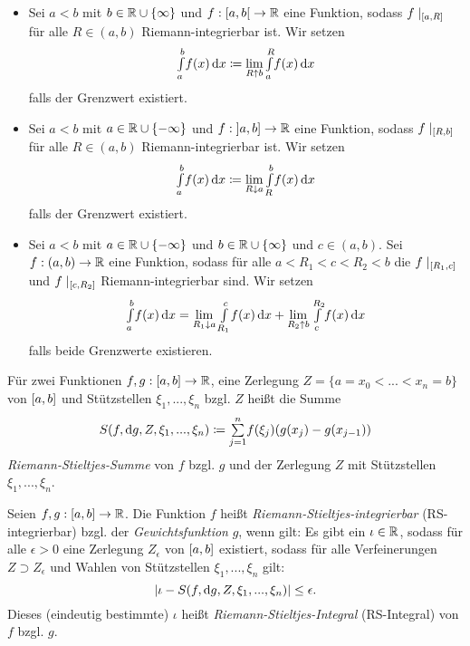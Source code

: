 \documentclass{cheat-sheet}
\begin{document}
\begin{defn}
\begin{itemize}
  \item Sei $a < b$ mit $b \in \mathbb{R} \cup \{ \infty \}$ und $f : \left[ a, b \right[ \to \mathbb{R}$ eine Funktion, sodass $f\mid_{\left[ a, R \right]}$ für alle $R \in (a, b)$ Riemann-integrierbar ist. Wir setzen
  \[ {\textstyle \int\limits_{a}^{b}} f(x) \,\mathrm{d} x \coloneqq \lim_{R \uparrow b} {\textstyle \int\limits_{a}^{R}} f(x) \,\mathrm{d} x \]
  falls der Grenzwert existiert.
  \item Sei $a < b$ mit $a \in \mathbb{R} \cup \{ -\infty \}$ und $f : \left] a, b \right] \to \mathbb{R}$ eine Funktion, sodass $f\mid_{\left[ R, b \right]}$ für alle $R \in (a, b)$ Riemann-integrierbar ist. Wir setzen
  \[ {\textstyle \int\limits_{a}^{b}} f(x) \,\mathrm{d} x \coloneqq \lim_{R \downarrow a} {\textstyle \int\limits_{R}^{b}} f(x) \,\mathrm{d} x \]
  falls der Grenzwert existiert.
  \item Sei $a < b$ mit $a \in \mathbb{R} \cup \{ -\infty \}$ und $b \in \mathbb{R} \cup \{ \infty \}$ und $c \in (a, b)$. Sei $f : (a, b) \to \mathbb{R}$ eine Funktion, sodass für alle $a < R_1 < c < R_2 < b$ die $f\mid_{\left[ R_1, c \right]}$ und $f\mid_{\left[ c, R_2 \right]}$ Riemann-integrierbar sind. Wir setzen
  \[ {\textstyle \int\limits_{a}^{b}} f(x) \,\mathrm{d} x = \lim_{R_1 \downarrow a} {\textstyle \int\limits_{R_1}^{c}} f(x) \,\mathrm{d} x + \lim_{R_2 \uparrow b} {\textstyle \int\limits_{c}^{R_2}} f(x) \,\mathrm{d} x \]
  falls beide Grenzwerte existieren.
\end{itemize}
\end{defn}


\begin{defn}
Für zwei Funktionen $f, g : \left[ a, b \right] \to \mathbb{R}$, eine Zerlegung $Z = \{ a = x_0 < ... < x_n = b \}$ von $\left[ a, b \right]$ und Stützstellen $\xi_1, ..., \xi_n$ bzgl. $Z$ heißt die Summe
\[ S(f, \d g, Z, \xi_1, ..., \xi_n) \coloneqq \sum_{j=1}^{n}\!f(\xi_j)(g(x_j) - g(x_{j{-}1})) \]
\emph{Riemann-Stieltjes-Summe} von $f$ bzgl. $g$ und der Zerlegung $Z$ mit Stützstellen $\xi_1, ..., \xi_n$.
\end{defn}

\begin{defn}
  Seien $f, g : \left[ a, b \right] \to \mathbb{R}$. Die Funktion $f$ heißt \emph{Riemann-Stieltjes-integrierbar} (RS-integrierbar) bzgl. der \emph{Gewichtsfunktion} $g$, wenn gilt: Es gibt ein $\iota \in \mathbb{R}$, sodass für alle $\epsilon > 0$ eine Zerlegung $Z_{\epsilon}$ von $\left[ a, b \right]$ existiert, sodass für alle Verfeinerungen $Z \supset Z_{\epsilon}$ und Wahlen von Stützstellen $\xi_1, ..., \xi_n$ gilt:
  \[ \lvert\iota - S(f, \mathrm{d} g, Z, \xi_1, ..., \xi_n)\rvert \le \epsilon. \]
  Dieses (eindeutig bestimmte) $\iota$ heißt \emph{Riemann-Stieltjes-Integral} (RS-Integral) von $f$ bzgl. $g$.
\end{defn}
\end{document}
